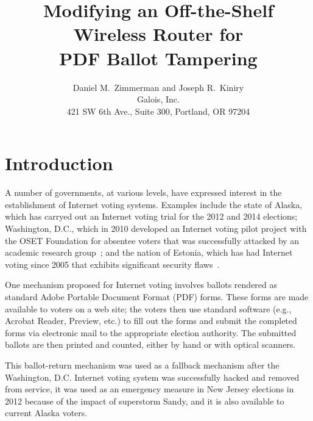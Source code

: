 \documentclass{article}
\newcommand{\eg}{e.g.,\xspace}
\newcommand{\etc}{etc.\xspace}
\begin{document}
\title{Modifying an Off-the-Shelf Wireless Router for \\ PDF Ballot Tampering}
\author{Daniel M.~Zimmerman and Joseph R.~Kiniry \\ Galois, Inc. \\
  421 SW 6th Ave., Suite 300, Portland, OR 97204}

\maketitle


\section{Introduction}

A number of governments, at various levels, have expressed interest in
the establishment of Internet voting systems. Examples include the
state of Alaska, which has carryed out an Internet voting trial for
the 2012 and 2014 elections; Washington, D.C., which in 2010 developed
an Internet voting pilot project with the OSET Foundation for absentee
voters that was successfully attacked by an academic research
group~\cite{DCVoting}; and the nation of Estonia, which has had
Internet voting since 2005 that exhibits significant security
flaws~\cite{EstoniaEVoting}.

One mechanism proposed for Internet voting involves ballots rendered
as standard Adobe Portable Document Format (PDF) forms. These forms
are made available to voters on a web site; the voters then use
standard software (\eg Acrobat Reader, Preview, \etc) to fill out the
forms and submit the completed forms via electronic mail to the
appropriate election authority. The submitted ballots are then printed
and counted, either by hand or with optical scanners.

This ballot-return mechanism was used as a fallback mechanism after
the Washington, D.C. Internet voting system was successfully hacked
and removed from service, it was used as an emergency measure in New
Jersey elections in 2012 because of the impact of superstorm Sandy,
and it is also available to current Alaska voters.
\end{document}
